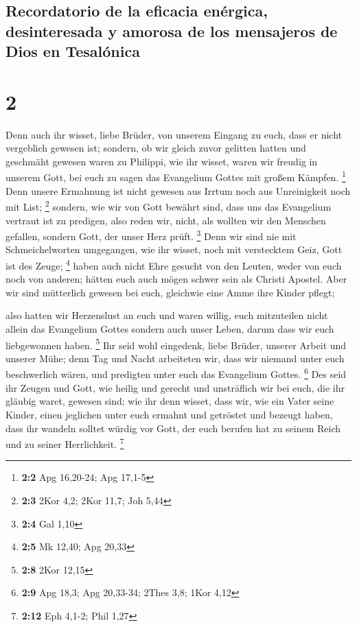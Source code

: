 \hypertarget{recordatorio-de-la-eficacia-enuxe9rgica-desinteresada-y-amorosa-de-los-mensajeros-de-dios-en-tesaluxf3nica}{%
\subsection{Recordatorio de la eficacia enérgica, desinteresada y
amorosa de los mensajeros de Dios en
Tesalónica}\label{recordatorio-de-la-eficacia-enuxe9rgica-desinteresada-y-amorosa-de-los-mensajeros-de-dios-en-tesaluxf3nica}}

\hypertarget{section-1}{%
\section{2}\label{section-1}}

 Denn auch ihr wisset, liebe Brüder, von unserem Eingang
zu euch, dass er nicht vergeblich gewesen ist;  sondern,
ob wir gleich zuvor gelitten hatten und geschmäht gewesen waren zu
Philippi, wie ihr wisset, waren wir freudig in unserem Gott, bei euch zu
sagen das Evangelium Gottes mit großem Kämpfen. \footnote{\textbf{2:2}
  Apg 16,20-24; Apg 17,1-5}  Denn unsere Ermahnung ist
nicht gewesen aus Irrtum noch aus Unreinigkeit noch mit List;
\footnote{\textbf{2:3} 2Kor 4,2; 2Kor 11,7; Joh 5,44} 
sondern, wie wir von Gott bewährt sind, dass uns das Evangelium vertraut
ist zu predigen, also reden wir, nicht, als wollten wir den Menschen
gefallen, sondern Gott, der unser Herz prüft. \footnote{\textbf{2:4} Gal
  1,10}  Denn wir sind nie mit Schmeichelworten
umgegangen, wie ihr wisset, noch mit verstecktem Geiz, Gott ist des
Zeuge; \footnote{\textbf{2:5} Mk 12,40; Apg 20,33}  haben
auch nicht Ehre gesucht von den Leuten, weder von euch noch von anderen;
 hätten euch auch mögen schwer sein als Christi Apostel.
Aber wir sind mütterlich gewesen bei euch, gleichwie eine Amme ihre
Kinder pflegt;

 also hatten wir Herzenslust an euch und waren willig,
euch mitzuteilen nicht allein das Evangelium Gottes sondern auch unser
Leben, darum dass wir euch liebgewonnen haben. \footnote{\textbf{2:8}
  2Kor 12,15}  Ihr seid wohl eingedenk, liebe Brüder,
unserer Arbeit und unserer Mühe; denn Tag und Nacht arbeiteten wir, dass
wir niemand unter euch beschwerlich wären, und predigten unter euch das
Evangelium Gottes. \footnote{\textbf{2:9} Apg 18,3; Apg 20,33-34; 2Thes
  3,8; 1Kor 4,12}  Des seid ihr Zeugen und Gott, wie
heilig und gerecht und unsträflich wir bei euch, die ihr gläubig waret,
gewesen sind;  wie ihr denn wisset, dass wir, wie ein
Vater seine Kinder, einen jeglichen unter euch ermahnt und getröstet
 und bezeugt haben, dass ihr wandeln solltet würdig vor
Gott, der euch berufen hat zu seinem Reich und zu seiner Herrlichkeit.
\footnote{\textbf{2:12} Eph 4,1-2; Phil 1,27}

